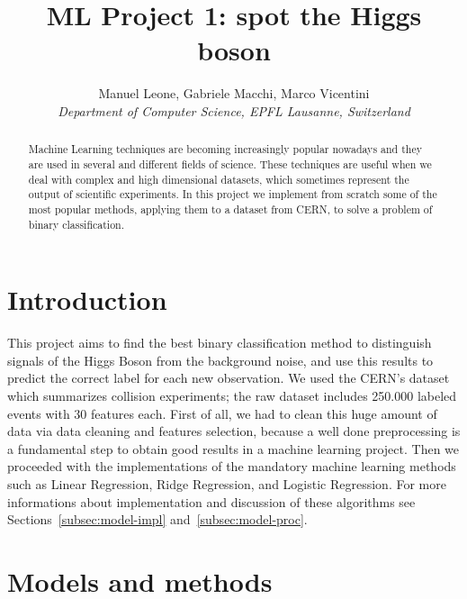 \documentclass[10pt,article]{IEEEtran}
\begin{document}
\title{ML Project 1: spot the Higgs boson}

\author{
  Manuel Leone, Gabriele Macchi, Marco Vicentini\\
  \textit{Department of Computer Science, EPFL Lausanne, Switzerland}
}

\maketitle

\begin{abstract}
Machine Learning techniques are becoming increasingly popular nowadays and they are used in several and different fields of science. These techniques are useful when we deal with complex and high dimensional datasets, which sometimes represent the output of scientific experiments. In this project we implement from scratch some of the most popular methods, applying them to a dataset from CERN, to solve a problem of binary classification.
\end{abstract}

\section{Introduction}

This project aims to find the best binary classification method to distinguish signals of the Higgs Boson from the background noise, and use this results to predict the correct label for each new observation. We used the CERN’s dataset which summarizes collision experiments; the raw dataset includes 250.000 labeled events with 30 features each. First of all, we had to clean this huge amount of data via data cleaning and features selection, because a well done preprocessing is a fundamental step to obtain good results in a machine learning project. Then we proceeded with the implementations of the mandatory machine learning methods such as Linear Regression, Ridge Regression, and Logistic Regression. For more informations about implementation and discussion of these algorithms see Sections~\ref{subsec:model-impl} and~\ref{subsec:model-proc}.

\section{Models and methods}
\label{sec:models-methods}
\end{document}
